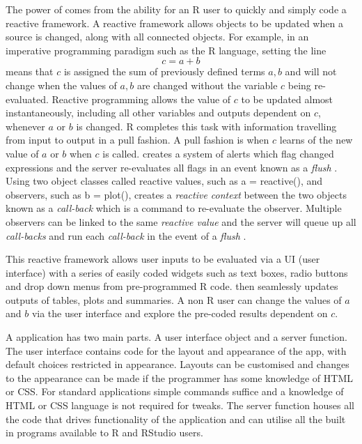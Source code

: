 The power of  comes from the ability for an R user to quickly and simply code a reactive framework.  A reactive framework allows objects to be updated when a source is changed, along with all connected objects.  For example, in an imperative programming paradigm such as the R language, setting the line 
\[c = a + b\] 
means that \(c\) is assigned the sum of previously defined terms \(a,b\) and will not change when the values of \(a,b\) are changed without the variable \(c\) being re-evaluated.  Reactive programming allows the value of \(c\) to be updated almost instantaneously, including all other variables and outputs dependent on \(c\), whenever \(a\) or \(b\) is changed.  R completes this task with information travelling from input to output in a pull fashion.  A pull fashion is when \(c\) learns of the new value of \(a\) or \(b\) when \(c\) is called.   creates a system of alerts which flag changed expressions and the server re-evaluates all flags in an event known as a \textit{flush} \citep{grolemund_shiny_2015}.  Using two object classes called reactive values, such as a = reactive(), and observers, such as b = plot(),  creates a \textit{reactive context} between the two objects known as a \textit{call-back} which is a command to re-evaluate the observer.  Multiple observers can be linked to the same \textit{reactive value} and the server will queue up all \textit{call-backs} and run each \textit{call-back} in the event of a \textit{flush} \citep{grolemund_shiny_2015}.

This reactive framework allows user inputs to be evaluated via a UI (user interface) with a series of easily coded widgets such as text boxes, radio buttons and drop down menus from pre-programmed R code.   then seamlessly updates outputs of tables, plots and summaries.  A non R user can change the values of \(a\) and \(b\) via the user interface and explore the pre-coded results dependent on \(c\).

A  application has two main parts.  A user interface object and a server function.  The user interface contains code for the layout and appearance of the app, with default choices restricted in appearance.  Layouts can be customised and changes to the appearance can be made if the programmer has some knowledge of HTML or CSS.  For standard applications simple commands suffice and a knowledge of HTML or CSS language is not required for tweaks.  The server function houses all the code that drives functionality of the application and can utilise all the built in programs available to R and RStudio users.

